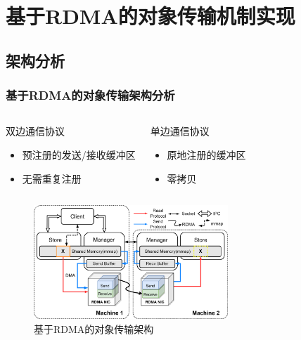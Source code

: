\section{基于RDMA的对象传输机制实现}

\subsection*{架构分析}
\begin{frame}
	\frametitle{基于RDMA的对象传输架构分析}

	\vspace{-1.6em}
	\begin{columns}[t]
		\begin{block}{双边通信协议}
			\begin{itemize}
				\item 预注册的发送/接收缓冲区
				\item 无需重复注册
			\end{itemize}
		\end{block}
		\begin{block}{单边通信协议}
			\begin{itemize}
				\item 原地注册的缓冲区
				\item 零拷贝
			\end{itemize}
		\end{block}
	\end{columns}

	\begin{figure}
		\centering
		\includegraphics[width=0.65\textwidth]{image/chap03/rdma_arch.png}
		\caption{基于RDMA的对象传输架构}
	\end{figure}

\end{frame}

